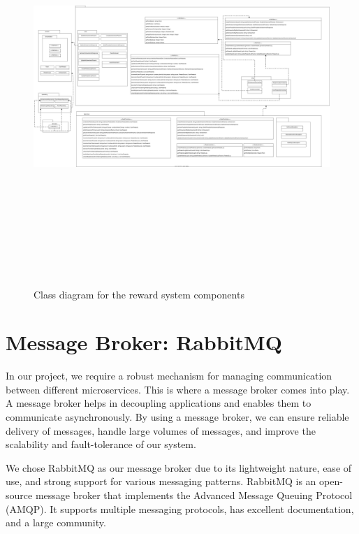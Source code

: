\begin{landscape}
    \begin{figure}[H]
        \centering
        \includegraphics[width=26cm, height=15cm]{src/assets/diagrams/nestclass.png}
        \caption{Class diagram for the reward system components}
        \label{fig:class-reward-system}
    \end{figure}
\end{landscape}

\section{Message Broker: RabbitMQ}

In our project, we require a robust mechanism for managing communication between different microservices. This is where a message broker comes into play. A message broker helps in decoupling applications and enables them to communicate asynchronously. By using a message broker, we can ensure reliable delivery of messages, handle large volumes of messages, and improve the scalability and fault-tolerance of our system.

We chose RabbitMQ as our message broker due to its lightweight nature, ease of use, and strong support for various messaging patterns. RabbitMQ is an open-source message broker that implements the Advanced Message Queuing Protocol (AMQP). It supports multiple messaging protocols, has excellent documentation, and a large community.

